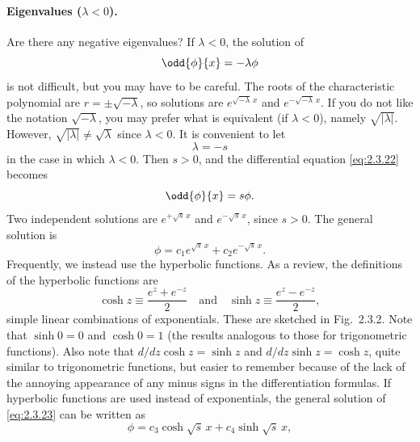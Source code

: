 \paragraph{Eigenvalues ($\lambda < 0$).}
Are there any negative eigenvalues? If $\lambda < 0$, the solution of
\begin{equation}
\label{eq:2.3.22}
\odd{\phi}{x} = -\lambda\phi
\end{equation}
is not difficult, but you may have to be careful. The roots of the characteristic polynomial are $r = \pm\sqrt{-\lambda}$, so solutions are $e^{\sqrt{-\lambda}\,x}$ and $e^{-\sqrt{-\lambda}\,x}$. If you do not like the notation $\sqrt{-\lambda}$, you may prefer what is equivalent (if $\lambda < 0$), namely $\sqrt{|\lambda|}$. However, $\sqrt{|\lambda|} \ne \sqrt{\lambda}$ since $\lambda < 0$. It is convenient to let
\[
\lambda = -s
\]
in the case in which $\lambda < 0$. Then $s > 0$, and the differential equation \eqref{eq:2.3.22} becomes
\begin{equation}
\label{eq:2.3.23}
\odd{\phi}{x} = s\phi.
\end{equation}
Two independent solutions are $e^{+\sqrt{s}\,x}$ and $e^{-\sqrt{s}\,x}$, since $s > 0$. The general solution is
\begin{equation}
\label{eq:2.3.24}
\phi = c_1 e^{\sqrt{s}\,x} + c_2 e^{-\sqrt{s}\,x}.
\end{equation}
Frequently, we instead use the hyperbolic functions. As a review, the definitions of the hyperbolic functions are
\[
\cosh z \equiv \frac{e^z + e^{-z}}{2} \quad\text{and}\quad \sinh z \equiv \frac{e^z - e^{-z}}{2},
\]
simple linear combinations of exponentials. These are sketched in Fig.~2.3.2. Note that $\sinh 0 = 0$ and $\cosh 0 = 1$ (the results analogous to those for trigonometric functions). Also note that $d/dz\cosh z = \sinh z$ and $d/dz\sinh z = \cosh z$, quite similar to trigonometric functions, but easier to remember because of the lack of the annoying appearance of any minus signs in the differentiation formulas. If hyperbolic functions are used instead of exponentials, the general solution of \eqref{eq:2.3.23} can be written as
\begin{equation}
\label{eq:2.3.25}
\phi = c_3\cosh\sqrt{s}\,x + c_4\sinh\sqrt{s}\,x,
\end{equation}
